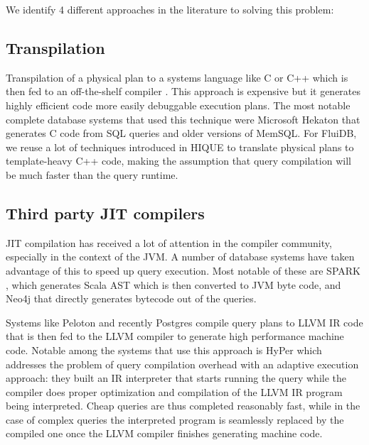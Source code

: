We identify 4 different approaches in the literature to solving this
problem:

\subsection{Transpilation}

Transpilation of a physical plan to a systems language like C or C++
which is then fed to an off-the-shelf compiler
\cite{krikellasGeneratingCodeHolistic2010}. This approach is expensive
but it generates highly efficient code more easily debuggable
execution plans. The most notable complete database systems that used
this technique were Microsoft Hekaton that generates C code from SQL queries and
older versions of MemSQL. For FluiDB, we reuse a lot of techniques
introduced in HIQUE \cite{krikellasGeneratingCodeHolistic2010} to
translate physical plans to template-heavy C++ code, making the
assumption that query compilation will be much faster than the query
runtime.

\subsection{Third party JIT compilers}

JIT compilation has received a lot of attention in the compiler
community, especially in the context of the JVM. A number of database
systems have taken advantage of this to speed up query execution. Most
notable of these are SPARK \cite{armbrustSparkSQLRelational2015}, which
generates Scala AST which is then converted to JVM byte code, and
Neo4j that directly generates bytecode out of the queries.

Systems like Peloton \cite{menonRelaxedOperatorFusion2017} and recently
Postgres \cite{sharyginQueryCompilationPostgreSQL2017} compile query
plans to LLVM IR code that is then fed to the LLVM compiler to
generate high performance machine code. Notable among the systems that
use this approach is HyPer \cite{neumannEvolutionCompilingQueryEngine}
which addresses the problem of query compilation overhead with an
adaptive execution approach: they built an IR interpreter that starts
running the query while the compiler does proper optimization and compilation of the
LLVM IR program being interpreted. Cheap queries are thus completed
reasonably fast, while in the case of complex queries the interpreted
program is seamlessly replaced by the compiled one once the LLVM
compiler finishes generating machine code.


